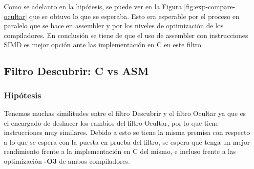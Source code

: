 \documentclass[a4paper]{article}
\begin{document}
Como se adelanto en la hipótesis, se puede ver en la Figura \ref{fig:exp-compare-ocultar} que se obtuvo lo que se esperaba. Esto era esperable por el proceso en paralelo que se hace en assembler y por los niveles de optimización de los compiladores. En conclusión se tiene de que el uso de assembler con instrucciones SIMD es mejor opción ante las implementación en C en este filtro.

\newpage 
\subsection{Filtro Descubrir: C vs ASM}
\subsubsection{Hipótesis}
Tenemos muchas similitudes entre el filtro Descubrir y el filtro Ocultar ya que es el encargado de deshacer los cambios del filtro Ocultar, por lo que tiene instrucciones muy similares. Debido a esto se tiene la misma premisa con respecto a lo que se espera con la puesta en prueba del filtro, se espera que tenga un mejor rendimiento frente a la implementación en C del mismo, e incluso frente a las optimización \textbf{-O3} de ambos compiladores.
\end{document}

